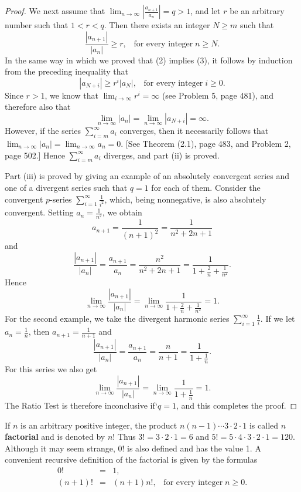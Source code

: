 \begin{proof}
We next assume that $\lim_{n \rightarrow \infty} |\frac{a_{n+1}}{a_n} |= q > 1$, and let $r$ be an arbitrary number such that $1 < r < q$. Then there exists an integer $N \geq m$ such that
$$
\frac{|a_{n+1}|}{|a_n|} \geq r, \;\;\;\mbox{for every integer}\; n \geq N.
$$
In the same way in which we proved that (2) implies (3), it follows by induction from the preceding inequality that
$$
|a_{N+i}| \geq r^i |a_N|, \;\;\;\mbox{for every integer}\; i \geq 0.
$$
Since $r > 1$, we know that $\lim_{i \rightarrow \infty} r^i = \infty$ (see Problem 5, page 481), and therefore also that 
$$
\lim_{n \rightarrow \infty} |a_n| = \lim_{n \rightarrow \infty} |a_{N+i} | = \infty .
$$
However, if the series $\sum_{i=m}^\infty a_i$ converges, then it necessarily follows that $\lim_{n \rightarrow \infty} |a_n| = \lim_{n \rightarrow \infty} a_n = 0$. [See Theorem (2.1), page 483, and Problem 2, page 502.] Hence $\sum_{i=m}^\infty a_i$ diverges, and part (ii) is proved.

Part (iii) is proved by giving an example of an absolutely convergent series and one of a divergent series such that $q = 1$ for each of them. Consider the convergent $p$-series $\sum_{i=1}^\infty \frac{1}{i^2}$, which, being nonnegative, is also absolutely convergent. Setting $a_n = \frac{1}{n^2}$, we obtain
$$
a_{n+1} = \frac{1}{(n+ 1)^2} = \frac{1}{n^2 + 2n + 1}
$$
and
$$
\frac{|a_{n+1}|}{|a_n|} = \frac{a_{n+1}}{a_n} = \frac{n^2}{n^2 + 2n + 1} = \frac{1}{1 + \frac{2}{n} + \frac{1}{n^2}}  .
$$
Hence
$$
\lim_{n \rightarrow \infty} \frac{|a_{n+1}|}{|a_n|} = \lim_{n \rightarrow \infty} \frac{1}{1 + \frac{2}{n} + \frac{1}{n^2}} = 1.
$$ 
For the second example, we take the divergent harmonic series $\sum_{i=1}^\infty \frac{1}{i}$. If we let $a_n = \frac{1}{n}$, then $a_{n+1} = \frac{1}{n + 1}$ and
$$
\frac{|a_{n+1}|}{|a_n|} = \frac{a_{n+1}}{a_n} = \frac{n}{n + 1} = \frac{1}{1 + \frac{1}{n}} .
$$
For this series we also get
$$
\lim_{n \rightarrow \infty} \frac{|a_{n+1}|}{|a_n|} = \lim_{n \rightarrow \infty} \frac{1}{1 + \frac{1}{n}} = 1.
$$
The Ratio Test is therefore inconclusive if`$q = 1$, and this completes the proof.
\end{proof}

If $n$ is an arbitrary positive integer, the product $n(n - 1) \cdots 3 \cdot  2 \cdot 1$ is called \textbf{$n$ factorial} and is denoted by $n!$ Thus $3! = 3 \cdot 2 \cdot 1 = 6$ and $5! = 5 \cdot 4 \cdot 3 \cdot 2 \cdot 1 = 120$. Although it may seem strange, $0!$ is also defined and has the value 1. A convenient recursive definition of the factorial is given by the formulas
\begin{eqnarray*}
        0! &=&  1,\\
(n + 1)! &=& (n + 1)n!, \;\;\;\mbox{for every integer}\; n \geq 0.
\end{eqnarray*}

